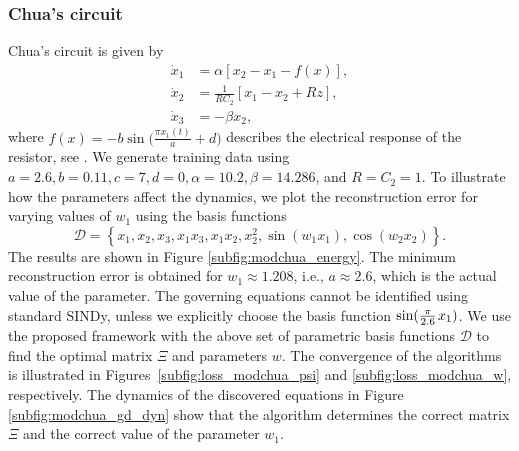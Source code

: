 \documentclass
[
    a4paper,
    DIV=11,
    abstract=true,
    11pt,
]
{scrartcl}
\newcommand{\ts}{\hspace*{0.1em}}                                %
\theoremstyle{definition}
\begin{document}
\subsubsection{Chua's circuit}

Chua's circuit \cite{madan1993chua, kilicc2010practical} is given by
\begin{equation*}
\begin{split}
    \dot{x}_1 &= \alpha[x_2 - x_1 - f(x)], \\
    \dot{x}_2 &= \frac{1}{RC_2}[x_1 - x_2 + Rz], \\
    \dot{x}_3 &= -\beta x_2,
\end{split}
\end{equation*}
where $f(x) = -b \sin\big(\frac{\pi x_1(t)}{a} + d\big)$ describes the electrical response of the resistor, see \cite{mishra2019modified}. We generate training data using $a = 2.6, b = 0.11, c = 7, d = 0, \alpha = 10.2, \beta = 14.286$, and $R = C_2 = 1$. To illustrate how the parameters affect the dynamics, we plot the reconstruction error for varying values of $w_1$ using the basis functions
\begin{equation*}
    \mathcal{D} = \left\{x_1, x_2, x_3, x_1 x_3, x_1 x_2, x_2^2, \sin(w_1 x_1), \cos(w_2 x_2) \right\}.
\end{equation*}
The results are shown in Figure \ref{subfig:modchua_energy}. The minimum reconstruction error is obtained for $w_1 \approx 1.208$, i.e., $a \approx 2.6$, which is the actual value of the parameter. The governing equations cannot be identified using standard SINDy, unless we explicitly choose the basis function $ \sin(\frac{\pi}{2.6} \ts x_1) $. We use the proposed framework with the above set of parametric basis functions $\mathcal{D}$ to find the optimal matrix $\Xi$ and parameters $w$. The convergence of the algorithms is illustrated in Figures~\ref{subfig:loss_modchua_psi} and \ref{subfig:loss_modchua_w}, respectively. The dynamics of the discovered equations in Figure \ref{subfig:modchua_gd_dyn} show that the algorithm determines the correct matrix $\Xi$ and the correct value of the parameter $w_1$.
\end{document}
